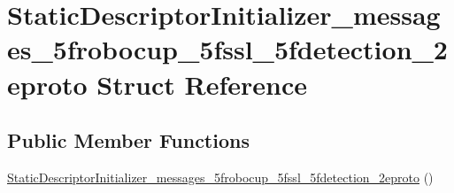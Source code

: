\hypertarget{struct_static_descriptor_initializer__messages__5frobocup__5fssl__5fdetection__2eproto}{\section{Static\-Descriptor\-Initializer\-\_\-messages\-\_\-5frobocup\-\_\-5fssl\-\_\-5fdetection\-\_\-2eproto Struct Reference}
\label{struct_static_descriptor_initializer__messages__5frobocup__5fssl__5fdetection__2eproto}
}
\subsection*{Public Member Functions}
\begin{DoxyCompactItemize}
\item 
\hyperlink{struct_static_descriptor_initializer__messages__5frobocup__5fssl__5fdetection__2eproto_a75e70cee69378b684352bc871b683d8a}{Static\-Descriptor\-Initializer\-\_\-messages\-\_\-5frobocup\-\_\-5fssl\-\_\-5fdetection\-\_\-2eproto} ()
\end{DoxyCompactItemize}


